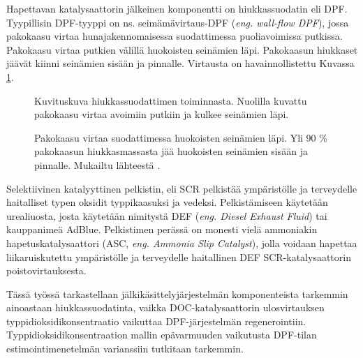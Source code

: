 Hapettavan katalysaattorin jälkeinen komponentti on hiukkassuodatin eli DPF.
Tyypillisin DPF-tyyppi on ns. seimämävirtaus-DPF (\emph{eng. wall-flow DPF}), jossa pakokaasu virtaa hunajakennomaisessa suodattimessa puoliavoimissa putkissa. Pakokaasu virtaa putkien välillä huokoisten seinämien läpi. Pakokaasun hiukkaset jäävät kiinni seinämien sisään ja pinnalle. Virtausta on havainnollistettu Kuvassa \ref{fig:wall-flow-dpf}.
%
\begin{figure}[H]
    \centering 
               {Kuvituskuva hiukkassuodattimen toiminnasta. Nuolilla kuvattu pakokaasu virtaa avoimiin putkiin ja kulkee seinämien läpi.}
    \caption{Pakokaasu virtaa suodattimessa huokoisten seinämien läpi. Yli 90 \% pakokaasun hiukkasmassasta jää huokoisten seinämien sisään ja pinnalle. Mukailtu lähteestä \cite{dieselnet_dpf}.}
    \label{fig:wall-flow-dpf}
\end{figure}
%


Selektiivinen katalyyttinen pelkistin, eli SCR pelkistää ympäristölle ja terveydelle haitalliset typen oksidit typpikaasuksi ja vedeksi. Pelkistämiseen käytetään urealiuosta, josta käytetään nimitystä DEF (\emph{eng. Diesel Exhaust Fluid}) tai kauppanimeä AdBlue. Pelkistimen perässä on monesti vielä ammoniakin hapetuskatalysaattori (ASC, \emph{eng. Ammonia Slip Catalyst}), jolla voidaan hapettaa liikaruiskutettu ympäristölle ja terveydelle haitallinen DEF SCR-katalysaattorin poistovirtauksesta.
 \cite{dieselnet_scr}

Tässä työssä tarkastellaan jälkikäsittelyjärjestelmän komponenteista tarkemmin ainoastaan hiukkassuodatinta, vaikka DOC-katalysaattorin ulosvirtauksen typpidioksidikonsentraatio vaikuttaa DPF-järjestelmän regenerointiin. Typpidioksidikonsentraation mallin epävarmuuden vaikutusta DPF-tilan estimointimenetelmän varianssiin tutkitaan tarkemmin.



